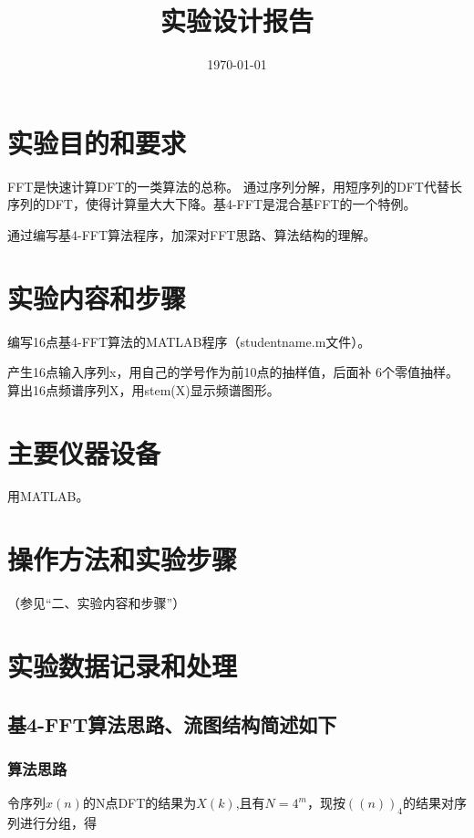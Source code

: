 \documentclass{../source/zjureport}
\title{实验设计报告}
\date{\today}
\begin{document}
    \makeheader

    \section{实验目的和要求}
    FFT是快速计算DFT的一类算法的总称。
    通过序列分解，用短序列的DFT代替长序列的DFT，使得计算量大大下降。基4-FFT是混合基FFT的一个特例。

    通过编写基4-FFT算法程序，加深对FFT思路、算法结构的理解。

    \section{实验内容和步骤}
    编写16点基4-FFT算法的MATLAB程序（studentname.m文件）。

    产生16点输入序列x，用自己的学号作为前10点的抽样值，后面补
    6个零值抽样。算出16点频谱序列X，用stem(X)显示频谱图形。

    \section{主要仪器设备}
    用MATLAB。

    \section{操作方法和实验步骤}
    （参见“二、实验内容和步骤”）

    \section{实验数据记录和处理}
        \subsection{基4-FFT算法思路、流图结构简述如下}
            \subsubsection{算法思路}
            令序列$x(n)$的N点DFT的结果为$X(k)$,且有$N = 4^m$，现按$((n))_4$的结果对序列进行分组，得
\end{document}
